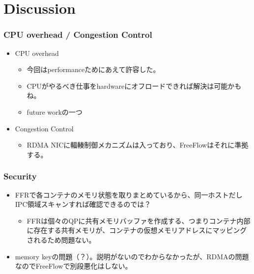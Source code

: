 \documentclass[dvipdfmx,9pt,notheorems]{beamer}
\theoremstyle{definition}
\begin{document}
\section{Discussion}
\begin{frame}\frametitle{CPU overhead / Congestion Control}
	\begin{itemize}
		\item CPU overhead
		\begin{itemize}
			\item 今回はperformanceためにあえて許容した。
			\item CPUがやるべき仕事をhardwareにオフロードできれば解決は可能かもね。
			\item future workの一つ
		\end{itemize}
		\item Congestion Control
		\begin{itemize}
			\item RDMA NICに輻輳制御メカニズムは入っており、FreeFlowはそれに準拠する。
		\end{itemize}
	\end{itemize}
\end{frame}

\begin{frame}\frametitle{Security}
	\begin{itemize}
		\item FFRで各コンテナのメモリ状態を取りまとめているから、同一ホストだしIPC領域スキャンすれば確認できるのでは？
		\begin{itemize}
			\item FFRは個々のQPに共有メモリバッファを作成する、つまりコンテナ内部に存在する共有メモリが、コンテナの仮想メモリアドレスにマッピングされるため問題ない。
		\end{itemize}
		\item memory keyの問題（？）。説明がないのでわからなかったが、RDMAの問題なのでFreeFlowで別段悪化はしない。
	\end{itemize}
\end{frame}
\end{document}
